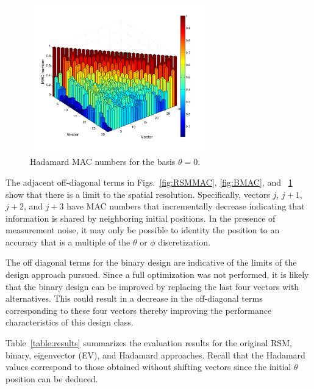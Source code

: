 \documentclass[3p,times]{elsarticle}
\begin{document}
\begin{figure}[ht!]
\includegraphics[width={3.0in}]{../figs/HadMAC.pdf}
\centering
\caption{Hadamard MAC numbers for the basis $\theta=0$.}
\label{fig:HadMAC}
\end{figure}

The adjacent off-diagonal terms in Figs.~\ref{fig:RSMMAC}, \ref{fig:BMAC}, and ~\ref{fig:HadMAC} show that there is a limit to the spatial resolution.  
Specifically, vectors $j$, $j+1$, $j+2$, and $j+3$ have MAC numbers that incrementally decrease indicating that information is shared by neighboring initial positions.  
In the presence of measurement noise, it may only be possible to identity the position to an accuracy that is a multiple of the $\theta$ or $\phi$ discretization.

The off diagonal terms for the binary design are indicative of the limits of the design approach pursued.  
Since a full optimization was not performed, it is likely that the binary design can be improved by replacing the last four vectors with alternatives. 
This could result in a decrease in the off-diagonal terms corresponding to these four vectors thereby improving the performance characteristics of this design class.

Table~\ref{table:results} summarizes the evaluation results for the original RSM, binary, eigenvector (EV), and Hadamard approaches.  
Recall that the Hadamard values correspond to those obtained without shifting vectors since the initial $\theta$ position can be deduced.
\end{document}
